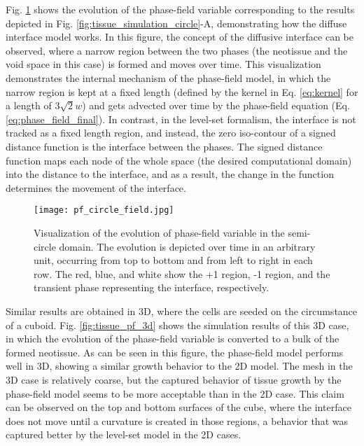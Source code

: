 Fig. \ref{fig:tissue_pf_circle_field} shows the evolution of the phase-field variable corresponding to the results depicted in Fig. \ref{fig:tissue_simulation_circle}-A, demonstrating how the diffuse interface model works. In this figure, the concept of the diffusive interface can be observed, where a narrow region between the two phases (the neotissue and the void space in this case) is formed and moves over time. This visualization demonstrates the internal mechanism of the phase-field model, in which the narrow region is kept at a fixed length (defined by the kernel in Eq. \ref{eq:kernel} for a length of $3 \sqrt{2} w$) and gets advected over time by the phase-field equation (Eq. \ref{eq:phase_field_final}). In contrast, in the level-set formalism, the interface is not tracked as a fixed length region, and instead, the zero iso-contour of a signed distance function is the interface between the phases. The signed distance function maps each node of the whole space (the desired computational domain) into the distance to the interface, and as a result, the change in the function determines the movement of the interface.


\begin{figure}
\centering
\medskip
\texttt{[image: pf\_circle\_field.jpg]}
\caption[Visualization of the evolution of phase-field variable in the semi-circle domain]{Visualization of the evolution of phase-field variable in the semi-circle domain. The evolution is depicted over time in an arbitrary unit, occurring from top to bottom and from left to right in each row. The red, blue, and white show the +1 region, -1 region, and the transient phase representing the interface, respectively.}
\label{fig:tissue_pf_circle_field}
\end{figure}

Similar results are obtained in 3D, where the cells are seeded on the circumstance of a cuboid. Fig. \ref{fig:tissue_pf_3d} shows the simulation results of this 3D case, in which the evolution of the phase-field variable is converted to a bulk of the formed neotissue. As can be seen in this figure, the phase-field model performs well in 3D, showing a similar growth behavior to the 2D model. The mesh in the 3D case is relatively coarse, but the captured behavior of tissue growth by the phase-field model seems to be more acceptable than in the 2D case. This claim can be observed on the top and bottom surfaces of the cube, where the interface does not move until a curvature is created in those regions, a behavior that was captured better by the level-set model in the 2D cases.

